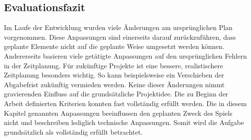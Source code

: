 \subsection{Evaluationsfazit}
Im Laufe der Entwicklung wurden viele Änderungen am ursprünglichen Plan vorgenommen. Diese Anpassungen sind einerseits darauf zurückzuführen, dass geplante Elemente nicht auf die geplante Weise umgesetzt werden können. Andererseits basieren viele getätigte Anpassungen auf den ursprünglichen Fehlern in der Zeitplanung. Für zukünftige Projekte ist eine bessere, realistischere Zeitplanung besonders wichtig. So kann beispielsweise ein Verschieben der Abgabefrist zukünftig vermieden werden.
Keine dieser Änderungen nimmt gravierenden Einfluss auf die grundsätzliche Projektidee. Die zu Beginn der Arbeit definierten Kriterien konnten fast vollständig erfüllt werden. Die in diesem Kapitel genannten Anpassungen beeinflussen den geplanten Zweck des Spiels nicht und beschreiben lediglich technische Anpassungen. Somit wird die Aufgabe grundsätzlich als vollständig erfüllt betrachtet.


